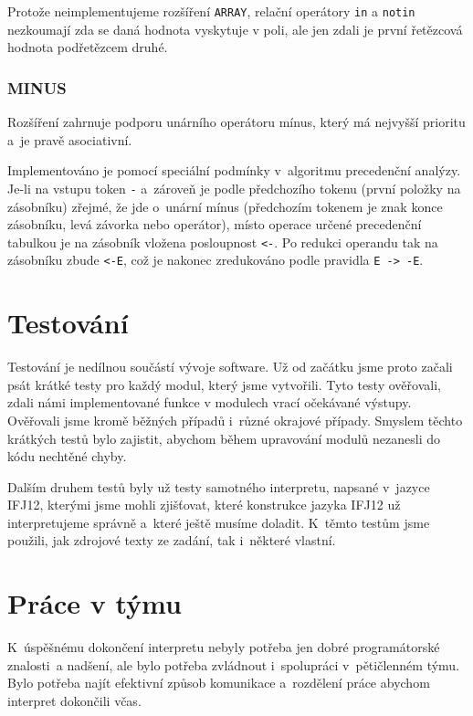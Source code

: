 \documentclass[12pt,a4paper,titlepage,final]{article}
\begin{document}
Protože neimplementujeme rozšíření \texttt{ARRAY}, relační operátory \texttt{in} 
a \texttt{notin} nezkoumají zda se daná hodnota vyskytuje v poli, ale jen zdali 
je první řetězcová hodnota podřetězcem druhé.

\subsubsection{MINUS}
Rozšíření zahrnuje podporu unárního operátoru mínus, který má nejvyšší 
prioritu a~je pravě asociativní.

Implementováno je pomocí speciální podmínky v~algoritmu precedenční analýzy. 
Je-li na vstupu token \texttt{-} a~zároveň je podle předchozího tokenu (první 
položky na zásobníku) zřejmé, že jde o~unární mínus (předchozím tokenem 
je znak konce zásobníku, levá závorka nebo operátor), místo operace určené 
precedenční tabulkou je na zásobník vložena posloupnost \texttt{<-}. Po redukci 
operandu tak na zásobníku zbude \texttt{<-E}, což je nakonec zredukováno 
podle pravidla \texttt{E -> -E}.


\section{Testování} \label{testovani}
Testování je nedílnou součástí vývoje software. Už od začátku jsme proto začali 
psát krátké testy pro každý modul, který jsme vytvořili. Tyto testy ověřovali, 
zdali námi implementované funkce v modulech vrací očekávané výstupy. Ověřovali 
jsme kromě běžných případů i~různé okrajové případy. Smyslem těchto krátkých testů 
bylo zajistit, abychom během upravování modulů nezanesli do kódu nechtěné chyby.

Dalším druhem testů byly už testy samotného interpretu, napsané v~jazyce IFJ12, 
kterými jsme mohli zjišťovat, které konstrukce jazyka IFJ12 už interpretujeme 
správně a~které ještě musíme doladit. K~těmto testům jsme použili, jak zdrojové 
texty ze zadání, tak i~některé vlastní.

\section{Práce v týmu} \label{prace_v_tymu}
K~úspěšnému dokončení interpretu nebyly potřeba jen dobré programátorské 
znalosti~a nadšení, ale bylo potřeba zvládnout i~spolupráci v~pětičlenném týmu. 
Bylo potřeba najít efektivní způsob komunikace a~rozdělení práce abychom interpret 
dokončili včas.
\end{document}

